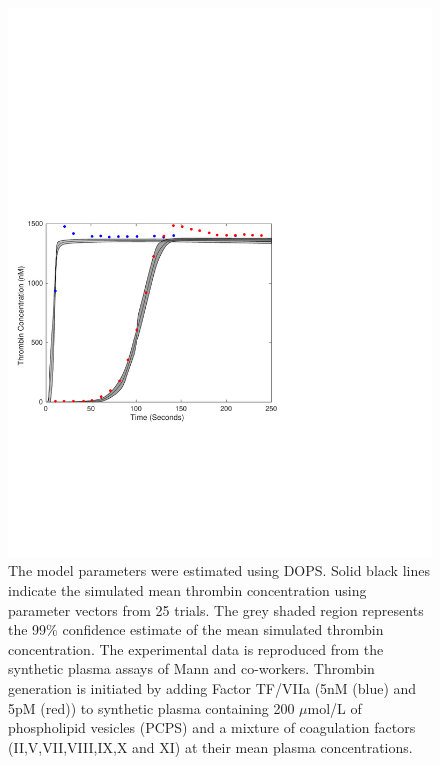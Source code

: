 \documentclass{bmcart}
\def\texttt{[image: ]}
\begin{document}
\begin{backmatter}
\begin{figure}[h!]
\centering
\includegraphics[trim = {0cm 6cm 7cm 6cm }, clip,width=1.0\textwidth]{./rachelfigs/ReplicateFigure5DivBySqrtN.pdf}
\caption{ The model parameters were estimated using DOPS. Solid black lines indicate the simulated mean thrombin concentration using parameter vectors from 25 trials. The grey shaded region represents the 99\% confidence estimate of the mean simulated thrombin concentration. The experimental data is reproduced from the synthetic plasma assays of Mann and co-workers. Thrombin generation is initiated by adding Factor TF/VIIa (5nM (blue) and 5pM (red)) to synthetic plasma containing 200 $\mu$mol/L of phospholipid vesicles (PCPS) and a mixture of coagulation factors (II,V,VII,VIII,IX,X and XI) at their mean plasma concentrations.
}\label{fig-train}
\end{figure}


\end{backmatter}
\end{document}
